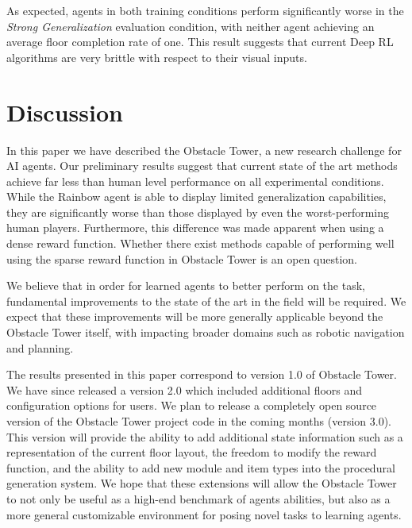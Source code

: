 \documentclass{article}
\begin{document}
As expected, agents in both training conditions perform significantly worse in the \emph{Strong Generalization} evaluation condition, with neither agent achieving an average floor completion rate of one. This result suggests that current Deep RL algorithms are very brittle with respect to their visual inputs.

\section{Discussion}


In this paper we have described the Obstacle Tower, a new research challenge for AI agents. Our preliminary results suggest that current state of the art methods achieve far less than human level performance on all experimental conditions. While the Rainbow agent is able to display limited generalization capabilities, they are significantly worse than those displayed by even the worst-performing human players. Furthermore, this difference was made apparent when using a dense reward function. Whether there exist methods capable of performing well using the sparse reward function in Obstacle Tower is an open question.

We believe that in order for learned agents to better perform on the task, fundamental improvements to the state of the art in the field will be required. We expect that these improvements will be more generally applicable beyond the Obstacle Tower itself, with impacting broader domains such as robotic navigation and planning.















The results presented in this paper correspond to version 1.0 of Obstacle Tower. We have since released a version 2.0 which included additional floors and configuration options for users. We plan to release a completely open source version of the Obstacle Tower project code in the coming months (version 3.0). This version will provide the ability to add additional state information such as a representation of the current floor layout, the freedom to modify the reward function, and the ability to add new module and item types into the procedural generation system. We hope that these extensions will allow the Obstacle Tower to not only be useful as a high-end benchmark of agents abilities, but also as a more general customizable environment for posing novel tasks to learning agents.
\end{document}
